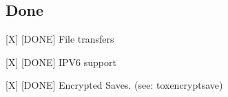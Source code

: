 \subsection*{Done}


\begin{DoxyItemize}
\item \mbox{[}X\mbox{]} \mbox{[}D\+O\+N\+E\mbox{]} File transfers
\item \mbox{[}X\mbox{]} \mbox{[}D\+O\+N\+E\mbox{]} I\+P\+V6 support
\item \mbox{[}X\mbox{]} \mbox{[}D\+O\+N\+E\mbox{]} Encrypted Saves. (see\+: toxencryptsave) 
\end{DoxyItemize}